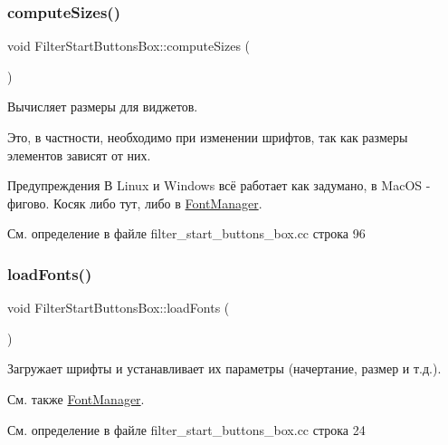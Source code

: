 \subsubsection{\texorpdfstring{compute\+Sizes()}{computeSizes()}}
{\footnotesize\ttfamily void Filter\+Start\+Buttons\+Box\+::compute\+Sizes (\begin{DoxyParamCaption}{ }\end{DoxyParamCaption})\hspace{0.3cm}{\ttfamily [private]}}



Вычисляет размеры для виджетов. 

Это, в частности, необходимо при изменении шрифтов, так как размеры элементов зависят от них.

\begin{DoxyWarning}{Предупреждения}
В Linux и Windows всё работает как задумано, в Mac\+OS -\/ фигово. Косяк либо тут, либо в \hyperlink{class_font_manager}{Font\+Manager}. 
\end{DoxyWarning}


См. определение в файле filter\+\_\+start\+\_\+buttons\+\_\+box.\+cc строка 96

\hypertarget{class_filter_start_buttons_box_ae3a208f9857ce99c02506e4005f71a60}{}\label{class_filter_start_buttons_box_ae3a208f9857ce99c02506e4005f71a60} 
\subsubsection{\texorpdfstring{load\+Fonts()}{loadFonts()}}
{\footnotesize\ttfamily void Filter\+Start\+Buttons\+Box\+::load\+Fonts (\begin{DoxyParamCaption}{ }\end{DoxyParamCaption})\hspace{0.3cm}{\ttfamily [private]}}



Загружает шрифты и устанавливает их параметры (начертание, размер и т.\+д.). 

\begin{DoxySeeAlso}{См. также}
\hyperlink{class_font_manager}{Font\+Manager}. 
\end{DoxySeeAlso}


См. определение в файле filter\+\_\+start\+\_\+buttons\+\_\+box.\+cc строка 24

